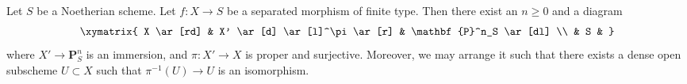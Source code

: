 %
\begin{lemma}
\label{lemma-chow-Noetherian}
\begin{reference}
\cite[II Theorem 5.6.1(a)]{EGA}
\end{reference}
Let $S$ be a Noetherian scheme.
Let $f : X \to S$ be a separated morphism of finite type.
Then there exist an $n \geq 0$ and a diagram
$$
\xymatrix{
X \ar[rd] & X' \ar[d] \ar[l]^\pi \ar[r] & \mathbf{P}^n_S \ar[dl] \\
& S &
}
$$
where $X' \to \mathbf{P}^n_S$ is an immersion, and
$\pi : X' \to X$ is proper and surjective. Moreover, we may
arrange it such that there exists a dense open subscheme
$U \subset X$ such that $\pi^{-1}(U) \to U$ is an isomorphism.
\end{lemma}

